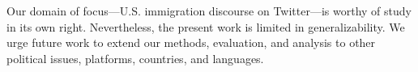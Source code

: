 Our domain of focus---U.S. immigration discourse on Twitter---is worthy of study in its own right. Nevertheless, the present work is limited in generalizability. We urge future work to extend our methods, evaluation, and analysis to other political issues, platforms, countries, and languages.  










